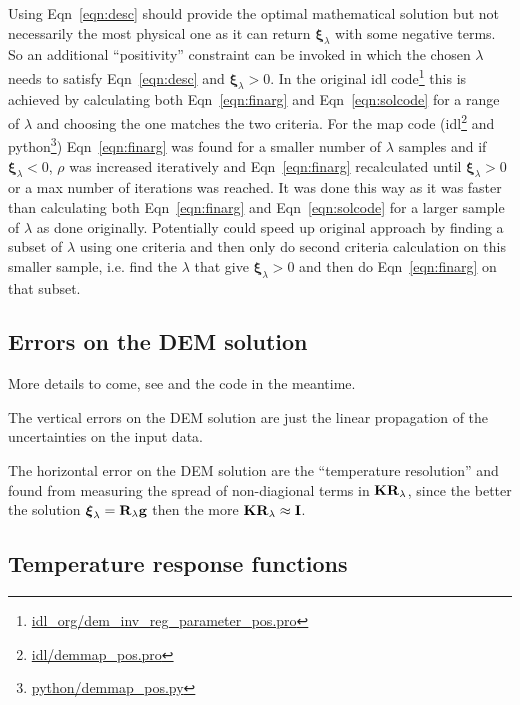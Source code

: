 \documentclass[12pt,a4paper]{article}
\begin{document}
Using Eqn~\ref{eqn:desc} should provide the optimal mathematical solution but not necessarily the most physical one as it can return $\boldsymbol{\xi}_\lambda$ with some negative terms. So an additional ``positivity'' constraint can be invoked in which the chosen $\lambda$ needs to satisfy Eqn~\ref{eqn:desc} and $\boldsymbol{\xi}_\lambda >0$. In the original idl code\footnote{\href{https://github.com/ianan/demreg/blob/master/idl_org/dem_inv_reg_parameter_pos.pro}{idl\_org/dem\_inv\_reg\_parameter\_pos.pro}} this is achieved by calculating both Eqn~\ref{eqn:finarg} and Eqn~\ref{eqn:solcode} for a range of $\lambda$ and choosing the one matches the two criteria. For the map code (idl\footnote{\href{https://github.com/ianan/demreg/blob/master/idl/demmap_pos.pro}{idl/demmap\_pos.pro}} and python\footnote{\href{https://github.com/ianan/demreg/blob/master/python/demmap_pos.py}{python/demmap\_pos.py}}) Eqn~\ref{eqn:finarg} was found for a smaller number of $\lambda$ samples and if $\boldsymbol{\xi}_\lambda <0$, $\rho$ was increased iteratively and Eqn~\ref{eqn:finarg} recalculated until $\boldsymbol{\xi}_\lambda >0$ or a max number of iterations was reached. It was done this way as it was faster than calculating both Eqn~\ref{eqn:finarg} and Eqn~\ref{eqn:solcode} for a larger sample of $\lambda$ as done originally. Potentially could speed up original approach by finding a subset of $\lambda$ using one criteria and then only do second criteria calculation on this smaller sample, i.e. find the $\lambda$ that give $\boldsymbol{\xi}_\lambda > 0$ and then do Eqn~\ref{eqn:finarg} on that subset.

\subsection*{Errors on the DEM solution}

More details to come, see \citet{2012A&A...539A.146H,2013A&A...553A..10H} and the code in the meantime.

The vertical errors on the DEM solution are just the linear propagation of the uncertainties on the input data.

The horizontal error on the DEM solution are the ``temperature resolution'' and found from measuring the spread of non-diagional terms in ${\bf K R_\lambda}$, since the better the solution $\boldsymbol{\xi}_\lambda = {\bf R}_\lambda {\bf g}$ then the more ${\bf K R_\lambda} \approx {\bf I}$.

\subsection*{Temperature response functions}
\end{document}
